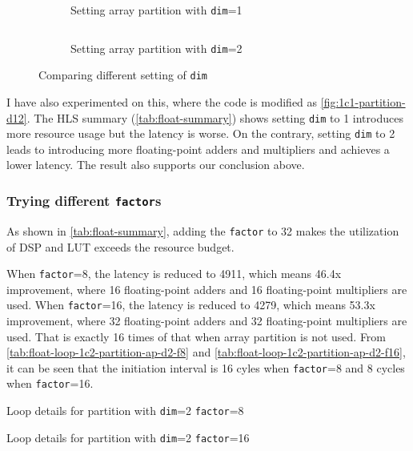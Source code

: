 \begin{figure}[ht!]
    \begin{subfigure}[b]{\textwidth}
        \inputminted[firstline=3]{diff}{program/1c1-partition-ap-d1-f2.diff}
        \caption{Setting array partition with \texttt{dim}=1}
        \label{fig:1c1-partition-ap-d1-f2.diff}
    \end{subfigure}
    \begin{subfigure}[b]{\textwidth}
        \inputminted[firstline=3]{diff}{program/1c1-partition-ap-d2-f2.diff}
        \caption{Setting array partition with \texttt{dim}=2}
        \label{fig:1c1-partition-ap-d2-f2.diff}
    \end{subfigure}
    \caption{Comparing different setting of \texttt{dim}}\label{fig:1c1-partition-d12}
\end{figure}

I have also experimented on this, where the code is modified as \autoref{fig:1c1-partition-d12}.
The HLS summary (\autoref{tab:float-summary}) shows setting \texttt{dim} to 1 introduces more resource usage but the latency is worse.
On the contrary, setting \texttt{dim} to 2 leads to introducing more floating-point adders and multipliers and achieves a lower latency.
The result also supports our conclusion above.

\subsubsection{Trying different \texttt{factor}s}\label{sec:1cFac}

As shown in \autoref{tab:float-summary}, adding the \texttt{factor} to 32 makes the utilization of DSP and LUT exceeds the resource budget.

When \texttt{factor}=8, the latency is reduced to 4911, which means 46.4x improvement, where 16 floating-point adders and 16 floating-point multipliers are used.
When \texttt{factor}=16, the latency is reduced to 4279, which means 53.3x improvement, where 32 floating-point adders and 32 floating-point multipliers are used.
That is exactly 16 times of that when array partition is not used.
From \autoref{tab:float-loop-1c2-partition-ap-d2-f8} and \autoref{tab:float-loop-1c2-partition-ap-d2-f16}, it can be seen that the initiation interval is 16 cyles when \texttt{factor}=8 and 8 cycles when \texttt{factor}=16.

\begin{table}[ht!]
    \caption{Loop details for partition with \texttt{dim}=2 \texttt{factor}=8}
    \label{tab:float-loop-1c2-partition-ap-d2-f8}
    \centering
    
\end{table}

\begin{table}[ht!]
    \caption{Loop details for partition with \texttt{dim}=2 \texttt{factor}=16}
    \label{tab:float-loop-1c2-partition-ap-d2-f16}
    \centering
    
\end{table}
